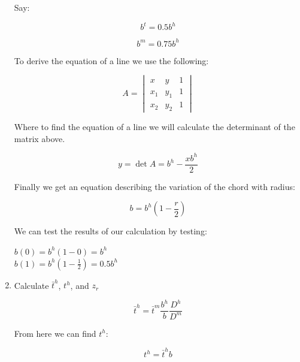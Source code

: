 \documentclass[titlepage]{article}
\begin{document}
\begin{enumerate}
    Say:

    \begin{equation}
        b^{t} = 0.5 b^{h}
    \end{equation}

    \begin{equation}
        b^{m} = 0.75 b^{h}
    \end{equation}

    To derive the equation of a line we use the following:

    \begin{center}
        $$ A =
        \begin{vmatrix}
            x & y & 1\\ 
            x_{1} & y_{1} & 1\\
            x_{2} & y_{2} & 1 
       \end{vmatrix}
         $$
    \end{center}

    Where to find the equation of a line we will calculate the determinant of the matrix above.

    \begin{equation}
        y = \det A = b^{h} - \frac{xb^{h}}{2}
    \end{equation}

    Finally we get an equation describing the variation of the chord with radius:

    \begin{equation}
        b = b^{h} \left(1 - \frac{r}{2}\right)
    \end{equation}

    We can test the results of our calculation by testing:

    \begin{center}
        $b(0) = b^{h}(1-0) = b^{h}$ \\
        $b(1) = b^{h}(1-\frac{1}{2}) = 0.5b^{h}$
    \end{center}

    \item Calculate $\bar{t}^{h}$, $t^{h}$, and $z_{r}$
    
    \begin{equation}
        \bar{t}^{h} = \bar{t}^{m} \frac{b^{h}}{b} \frac{D^{h}}{D^{m}}
    \end{equation}

    From here we can find $t^{h}$:

    \begin{equation}
        t^{h} = \bar{t}^{h} b
    \end{equation}


\end{enumerate}
\end{document}
